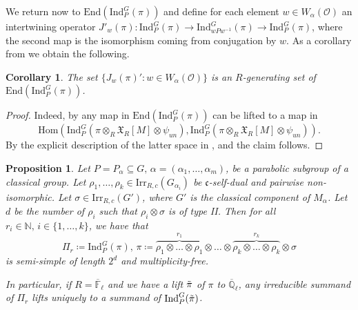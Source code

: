 \documentclass[10pt,a4paper]{article}
\newtheorem{corollary}{Corollary}[section]
\newtheorem{prop}{Proposition}
\theoremstyle{remark}
\theoremstyle{definition}
\newcommand{\fl}{{\overline{\mathbb{F}}_\ell}}
\newcommand{\ql}{{\overline{\mathbb{Q}}_\ell}}
\newcommand{\ip}{\mathrm{Ind}_P^G}
\newcommand{\ho}{\mathrm{Hom}}
\newcommand{\id}{\mathrm{Ind}}
\newcommand{\xc}{\mathfrak{X}}
\newcommand{\un}{_{un}}
\newcommand{\ra}{\rightarrow}
\newcommand{\ain}[3]{#1\in\{#2,\ldots,#3\}}
\newcommand{\tpi}{\Tilde{\pi}}
\newcommand{\NN}{\mathbb{N}}
\newcommand{\ed}{\mathrm{End}}
\newcommand{\irr}{\mathrm{Irr}}
\newcommand{\scrO}{\mathscr{O}}
\newcommand{\fc}{\mathfrak{c}}
\begin{document}
We return now to $\ed(\ip(\pi))$ and define for each element $w\in W_\alpha(\scrO)$ an intertwining operator $J'_{w}(\pi)\colon \ip(\pi)\ra\id_{wPw^{-1}}^G(\pi)\ra\ip(\pi)$, where the second map is the isomorphism coming from conjugation by $w$.
As a corollary from  we obtain the following.
\begin{corollary}\label{C:pro}
    The set $\{J_{w}(\pi)':w\in W_\alpha(\scrO)\}$ is an $R$-generating set of $\ed(\ip(\pi))$.
\end{corollary}
\begin{proof}
    Indeed, by  any map in $\ed(\ip(\pi))$ can be lifted to a map in \[\ho(\ip(\pi\otimes_R\xc_R[M]\otimes\psi\un),\ip(\pi\otimes_R\xc_R[M]\otimes\psi\un)).\] By the explicit description of the latter space in , \cite[Theorem 5.10]{Heiermann2011} and \cite[Proposition 7.8]{Dat05} the claim follows.
\end{proof}
\begin{prop}\label{P:basecasetemperedl}
    Let $P=P_\alpha\subseteq G,\,\alpha=(\alpha_1,\ldots,\alpha_m)$, be a parabolic subgroup of a classical group.
    Let $\rho_1,\ldots,\rho_k\in\irr_{R,c}(G_{\alpha_i})$ be $\fc$-self-dual and pairwise non-isomorphic. Let  $\sigma\in \irr_{R,c}(G')$, where $G'$ is the classical component of $M_\alpha$. Let $d$ be the number of $\rho_i$ such that $\rho_i\otimes \sigma$ is of type II.
    Then for all $r_i\in\NN,\,\ain{i}{1}{k}$, we have that 
    \[\Pi_r\coloneqq \ip(\pi),\,\pi\coloneqq\overbrace{\rho_1\otimes\ldots\otimes\rho_1}^{r_1}\otimes\ldots\otimes\overbrace{\rho_k\otimes\ldots\otimes\rho_k}^{r_k}\otimes \sigma\] is semi-simple of length $2^d$ and multiplicity-free.

In particular, if $R=\fl$ and we have a lift $\tpi$ of $\pi$ to $\ql$, any irreducible summand of $\Pi_r$ lifts uniquely to a summand of $\ip(\tpi)$.    
\end{prop}
\end{document}
